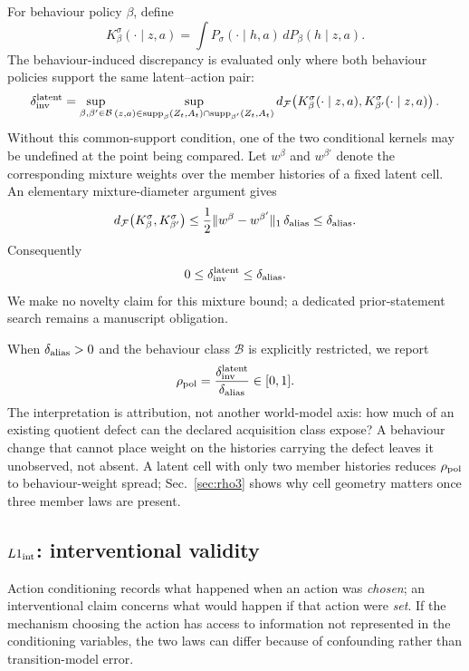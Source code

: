 \documentclass[10pt]{article}
\newcommand{\dF}{d_{\mathcal F}}
\begin{document}
For behaviour policy $\beta$, define
\[
K_\beta^\sigma(\cdot\mid z,a)
=
\int P_\sigma(\cdot\mid h,a)\,dP_\beta(h\mid z,a).
\]
The behaviour-induced discrepancy is evaluated only where both behaviour policies support the same latent--action pair:
\[
\delta_{\rm inv}^{\rm latent}
=
\sup_{\beta,\beta'\in\mathcal B}
\sup_{(z,a)\in \mathrm{supp}_\beta(Z_t,A_t)\cap\mathrm{supp}_{\beta'}(Z_t,A_t)}
\dF\!\left(
K_\beta^\sigma(\cdot\mid z,a),
K_{\beta'}^\sigma(\cdot\mid z,a)
\right).
\]
Without this common-support condition, one of the two conditional kernels may be undefined at the point being compared. Let $w^\beta$ and $w^{\beta'}$ denote the corresponding mixture weights over the member histories of a fixed latent cell. An elementary mixture-diameter argument gives
\[
\dF\!\left(K_\beta^\sigma,K_{\beta'}^\sigma\right)
\le
\frac12\lVert w^\beta-w^{\beta'}\rVert_1\,\delta_{\rm alias}
\le \delta_{\rm alias}.
\]
Consequently
\[
0\le \delta_{\rm inv}^{\rm latent}\le\delta_{\rm alias}.
\]
We make no novelty claim for this mixture bound; a dedicated prior-statement search remains a manuscript obligation.

When $\delta_{\rm alias}>0$ and the behaviour class $\mathcal B$ is explicitly restricted, we report
\[
\rho_{\rm pol}
=
\frac{\delta_{\rm inv}^{\rm latent}}{\delta_{\rm alias}}
\in[0,1].
\]
The interpretation is attribution, not another world-model axis: how much of an existing quotient defect can the declared acquisition class expose? A behaviour change that cannot place weight on the histories carrying the defect leaves it unobserved, not absent. A latent cell with only two member histories reduces $\rho_{\rm pol}$ to behaviour-weight spread; Sec.~\ref{sec:rho3} shows why cell geometry matters once three member laws are present.

\subsection{$L1_{\rm int}$: interventional validity}

Action conditioning records what happened when an action was \emph{chosen}; an interventional claim concerns what would happen if that action were \emph{set}. If the mechanism choosing the action has access to information not represented in the conditioning variables, the two laws can differ because of confounding rather than transition-model error.
\end{document}
